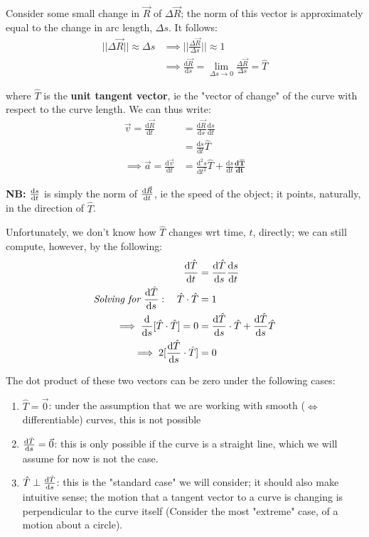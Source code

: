 \documentclass[12pt]{article}
\begin{document}
{Consider some small change in $\vec{R}$ of $\Delta \vec{R}$; the norm of this vector is approximately equal to the change in arc length, $\Delta s$. It follows: \begin{align*}
    ||\Delta \vec{R}|| \approx \Delta s &\implies ||\frac{\Delta \vec{R}}{\Delta s}|| \approx 1\\
    &\implies \frac{\text{d}\vec{R}}{\text{d}s} = \lim_{\Delta s \to 0} \frac{\Delta \vec{R}}{\Delta s} = \hat{T}
\end{align*}

where $\hat{T}$ is the \textbf{unit tangent vector}, ie the "vector of change" of the curve with respect to the curve length. We can thus write: \begin{align*}
    \vec{v} = \frac{\text{d} \vec{R}}{\text{d}t} &= \frac{\text{d}\vec{R}}{\text{d}s}\frac{\text{d}s}{\text{d}t}\\
    &= \frac{\text{d}s}{\text{d}t} \hat{T}\\
    \implies \vec{a} = \frac{\text{d}\vec{v}}{\text{d}t} &= \frac{\text{d}^2 s}{\text{d}t^2} \hat{T} + \frac{\text{d}s}{\text{d}t} \mathbf{\frac{\textbf{d}\hat{T}}{\textbf{d}t}}
\end{align*}

\textbf{NB:} $\frac{\text{d}s}{\text{d}t}$ is simply the norm of $\frac{\text{d}\vec{R}}{\text{d}t}$, ie the speed of the object; it points, naturally, in the direction of $\hat{T}$.

Unfortunately, we don't know how $\hat{T}$ changes wrt time, $t$, directly; we can still compute, however, by the following: \begin{align*}
    \frac{\text{d}\hat{T}}{\text{d}t} &= \frac{\text{d}\hat{T}}{\text{d}s} \frac{\text{d}s}{\text{d}t}\\
    \textit{Solving for } \frac{\text{d}\hat{T}}{\text{d}s}: \quad \hat{T} \cdot \hat{T} &= 1\\
    \implies \frac{\text{d}}{\text{d}s}[ \hat{T} \cdot \hat{T}] = 0 &= \frac{\text{d}\hat{T}}{\text{d}s}\cdot \hat{T} + \frac{\text{d}\hat{T}}{\text{d}s}\hat{T}\\
    \implies 2[\frac{\text{d}\hat{T}}{\text{d}s}\cdot \hat{T}] &= 0\\
\end{align*}

The dot product of these two vectors can be zero under the following cases:
\begin{enumerate}
    \item $\hat{T} = \vec{0}$: under the assumption that we are working with smooth ($\iff$ differentiable) curves, this is not possible
    \item $\frac{\text{d}\hat{T}}{\text{d}s} = \vec{0}$: this is only possible if the curve is a straight line, which we will assume for now is not the case. %
    \item $\hat{T} \perp \frac{\text{d}\hat{T}}{\text{d}s}$: this is the "standard case" we will consider; it should also make intuitive sense; the motion that a tangent vector to a curve is changing is perpendicular to the curve itself (Consider the most "extreme" case, of a motion about a circle).
\end{enumerate}

}
\end{document}
